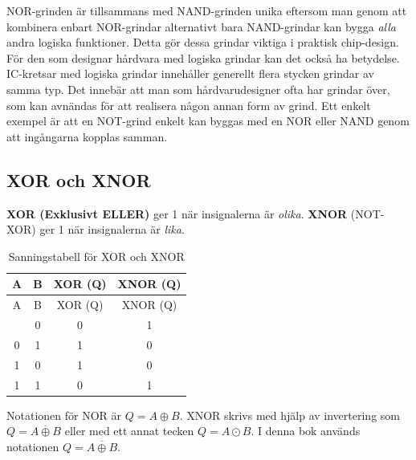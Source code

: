 \documentclass[
  swedish,
  letterpaper,
  oneside,
  openany]{book}
\begin{document}
\begin{tcolorbox}[enhanced jigsaw, arc=.35mm, bottomrule=.15mm, bottomtitle=1mm, breakable, colback=white, colbacktitle=quarto-callout-tip-color!10!white, colframe=quarto-callout-tip-color-frame, coltitle=black, left=2mm, leftrule=.75mm, opacityback=0, opacitybacktitle=0.6, rightrule=.15mm, title=\textcolor{quarto-callout-tip-color}{\faLightbulb}\hspace{0.5em}{NOR-grinden och NAND-grinden: De universella byggstenenarna}, titlerule=0mm, toprule=.15mm, toptitle=1mm]

NOR-grinden är tillsammans med NAND-grinden unika eftersom man genom att
kombinera enbart NOR-grindar alternativt bara NAND-grindar kan bygga
\emph{alla} andra logiska funktioner. Detta gör dessa grindar viktiga i
praktisk chip-design. För den som designar hårdvara med logiska grindar
kan det också ha betydelse. IC-kretsar med logiska grindar innehåller
generellt flera stycken grindar av samma typ. Det innebär att man som
hårdvarudesigner ofta har grindar över, som kan avnändas för att
realisera någon annan form av grind. Ett enkelt exempel är att en
NOT-grind enkelt kan byggas med en NOR eller NAND genom att ingångarna
kopplas samman.

\end{tcolorbox}

\subsection{XOR och XNOR}\label{xor-och-xnor}

\textbf{XOR (Exklusivt ELLER)} ger 1 när insignalerna är \emph{olika}.
\textbf{XNOR} (NOT-XOR) ger 1 när insignalerna är \emph{lika}.

\begin{longtable}[]{@{}cccc@{}}
\caption{Sanningstabell för XOR och
XNOR}\label{tbl-xor-xnor}\tabularnewline
\toprule\noalign{}
A & B & XOR (Q) & XNOR (Q) \\
\midrule\noalign{}
\endfirsthead
\toprule\noalign{}
A & B & XOR (Q) & XNOR (Q) \\
\midrule\noalign{}
\endhead
\bottomrule\noalign{}
\endlastfoot
0 & 0 & 0 & 1 \\
0 & 1 & 1 & 0 \\
1 & 0 & 1 & 0 \\
1 & 1 & 0 & 1 \\
\end{longtable}

Notationen för NOR är \(Q = A \oplus B\). XNOR skrivs med hjälp av
invertering som \(Q = \overline{A \oplus B}\) eller med ett annat tecken
\(Q = A \odot B\). I denna bok används notationen
\(Q = \overline{A \oplus B}\).
\end{document}
